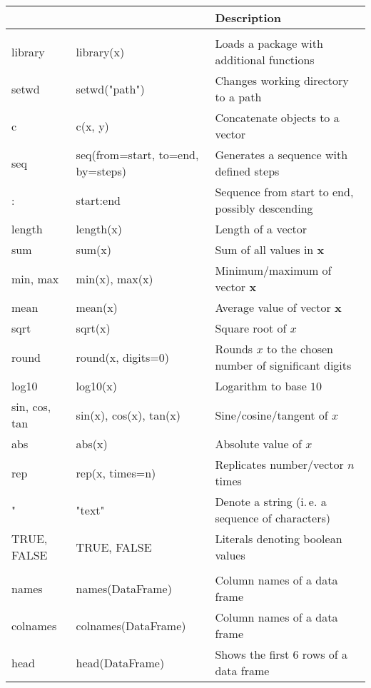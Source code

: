 \documentclass[a4paper,9pt]{scrartcl}
\begin{document}
\begin{longtable}{|>{\raggedright\arraybackslash\collectcell\columnaslst}p{2.5cm}<{\endcollectcell}%
|>{\raggedright\arraybackslash\collectcell\columnaslst}p{6.0cm}<{\endcollectcell}|%
>{\raggedright\arraybackslash}p{6.7cm}|}
\hline
\multicolumn{1}{|l|}{\textbf{Command}} & \multicolumn{1}{l|}{\textbf{Syntax/Example}} & \textbf{Description} \\ \hline
%
\multicolumn{3}{|c|}{\cellcolor{TableColor}\textbf{Basic Operations}} \\ \hline
%
library & library(x) & Loads a package with additional functions \\
setwd & setwd("path") & Changes working directory to a path \\
c & c(x, y) & Concatenate objects to a vector \\
seq & seq(from=start, to=end, by=steps) & Generates a sequence with defined steps \\
: & start:end & Sequence from start to end, possibly descending \\
length & length(x) & Length of a vector \\
sum & sum(x) & Sum of all values in $\bm{x}$ \\
min, max & min(x), max(x) & Minimum/maximum of vector $\bm{x}$ \\
mean & mean(x) & Average value of vector $\bm{x}$ \\
sqrt & sqrt(x) & Square root of $x$ \\
round & round(x, digits=0) & Rounds $x$ to the chosen number of significant digits \\
log10 & log10(x) & Logarithm to base $10$ \\
sin, cos, tan & sin(x), cos(x), tan(x) & Sine/cosine/tangent of $x$ \\
abs & abs(x) & Absolute value of $x$ \\
rep & rep(x, times=n) & Replicates number/vector $n$ times \\
" & "text" & Denote a string (i.\,e. a sequence of characters) \\%
TRUE, FALSE & TRUE, FALSE & Literals denoting boolean values \\%
\hline
\multicolumn{3}{|c|}{\cellcolor{TableColor}\textbf{Data Collection}} \\ \hline
%
names & names(DataFrame) & Column names of a data frame \\
colnames & colnames(DataFrame) & Column names of a data frame \\
head & head(DataFrame) & Shows the first $6$ rows of a data frame \\

\end{longtable}
\end{document}

